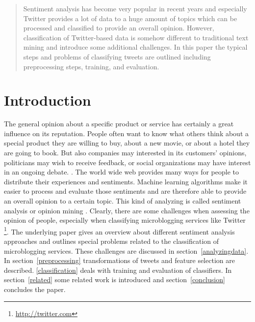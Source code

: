 \documentclass{acm_proc_article-sp}
\begin{document}

\maketitle
\begin{abstract} Sentiment analysis has become very popular in recent years and
    especially Twitter provides a lot of data to a huge amount of topics which
    can be processed and classified to provide an overall opinion. However,
    classification of Twitter-based data is somehow different to traditional
    text mining and introduce some additional challenges. In this paper the
    typical steps and problems of classifying tweets are outlined including
    preprocessing steps, training, and evaluation.  \end{abstract}





\section{Introduction} The general opinion about a specific product or service
has certainly a great influence on its reputation. People often want to know
what others think about a special product they are willing to buy, about a new
movie, or about a hotel they are going to book. But also companies may
interested in its customers' opinions, politicians may wish to receive
feedback, or social organizations may have interest in an ongoing debate.
\cite{pak2010twitter}.  The world wide web provides many ways for people to
distribute their experiences and sentiments. Machine learning algorithms make
it easier to process and evaluate those sentiments and are therefore able to
provide an overall opinion to a certain topic. This kind of analyzing is called
sentiment analysis or opinion mining \cite{liu2010sentimentanalysis,
pang2008opinion}. Clearly, there are some challenges when assessing the opinion
of people, especially when classifying microblogging services like Twitter
\footnote{\url{http://twitter.com}}. The underlying paper gives an overview
about different sentiment analysis approaches and outlines special problems
related to the classification of microblogging services. These challenges are
discussed in section~\ref{analyzingdata}. In section~\ref{preprocessing}
transformations of tweets and feature selection are described.
\ref{classification} deals with training and evaluation of classifiers. In
section~\ref{related} some related work is introduced and
section~\ref{conclusion} concludes the paper.
\end{document}
